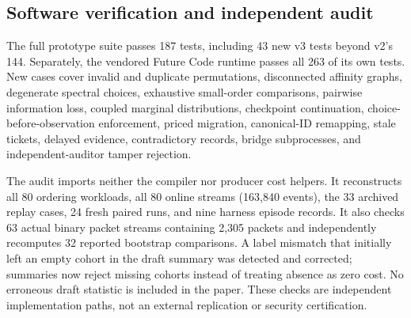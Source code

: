 \subsection{Software verification and independent audit}
The full prototype suite passes 187 tests, including 43 new v3 tests beyond v2's 144. Separately, the vendored Future Code runtime passes all 263 of its own tests. New cases cover invalid and duplicate permutations, disconnected affinity graphs, degenerate spectral choices, exhaustive small-order comparisons, pairwise information loss, coupled marginal distributions, checkpoint continuation, choice-before-observation enforcement, priced migration, canonical-ID remapping, stale tickets, delayed evidence, contradictory records, bridge subprocesses, and independent-auditor tamper rejection.

The audit imports neither the compiler nor producer cost helpers. It reconstructs all 80 ordering workloads, all 80 online streams (163,840 events), the 33 archived replay cases, 24 fresh paired runs, and nine harness episode records. It also checks 63 actual binary packet streams containing 2,305 packets and independently recomputes 32 reported bootstrap comparisons. A label mismatch that initially left an empty cohort in the draft summary was detected and corrected; summaries now reject missing cohorts instead of treating absence as zero cost. No erroneous draft statistic is included in the paper. These checks are independent implementation paths, not an external replication or security certification.
